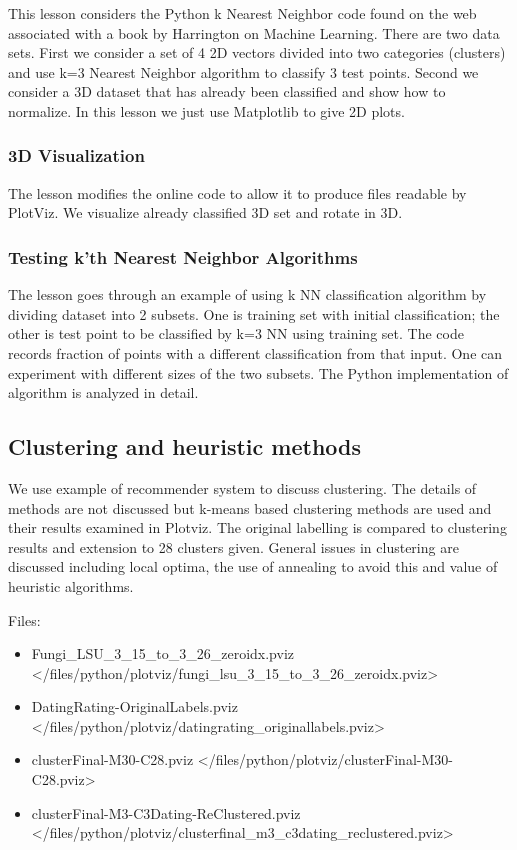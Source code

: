 This lesson considers the Python k Nearest Neighbor code found on the
web associated with a book by Harrington on Machine Learning. There are
two data sets. First we consider a set of 4 2D vectors divided into two
categories (clusters) and use k=3 Nearest Neighbor algorithm to classify
3 test points. Second we consider a 3D dataset that has already been
classified and show how to normalize. In this lesson we just use
Matplotlib to give 2D plots.

\subsubsection{3D Visualization}\label{d-visualization}

The lesson modifies the online code to allow it to produce files
readable by PlotViz. We visualize already classified 3D set and rotate
in 3D.

\subsubsection{Testing k'th Nearest Neighbor
Algorithms}\label{testing-kth-nearest-neighbor-algorithms}

The lesson goes through an example of using k NN classification
algorithm by dividing dataset into 2 subsets. One is training set with
initial classification; the other is test point to be classified by k=3
NN using training set. The code records fraction of points with a
different classification from that input. One can experiment with
different sizes of the two subsets. The Python implementation of
algorithm is analyzed in detail.

\subsection{Clustering and heuristic
methods}\label{clustering-and-heuristic-methods}

We use example of recommender system to discuss clustering. The details
of methods are not discussed but k-means based clustering methods are
used and their results examined in Plotviz. The original labelling is
compared to clustering results and extension to 28 clusters given.
General issues in clustering are discussed including local optima, the
use of annealing to avoid this and value of heuristic algorithms.

Files:

\begin{itemize}

\item
  Fungi\_LSU\_3\_15\_to\_3\_26\_zeroidx.pviz \textless{}/files/python/plotviz/fungi\_lsu\_3\_15\_to\_3\_26\_zeroidx.pviz\textgreater{}
\item
  DatingRating-OriginalLabels.pviz \textless{}/files/python/plotviz/datingrating\_originallabels.pviz\textgreater{}
\item
  clusterFinal-M30-C28.pviz \textless{}/files/python/plotviz/clusterFinal-M30-C28.pviz\textgreater{}
\item
  clusterFinal-M3-C3Dating-ReClustered.pviz \textless{}/files/python/plotviz/clusterfinal\_m3\_c3dating\_reclustered.pviz\textgreater{}
\end{itemize}

